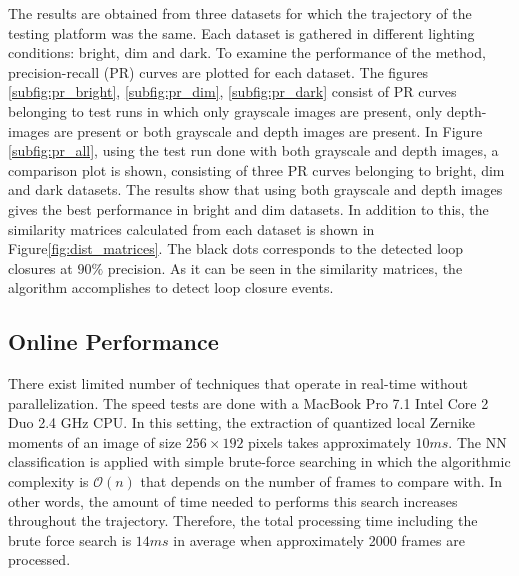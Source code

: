 \documentclass[]{spie}  %
\begin{document}
The results are obtained from three datasets for which the trajectory of the testing platform was the same. Each dataset is gathered in different lighting conditions: bright, dim and dark.
To examine the performance of the method, precision-recall (PR) curves are plotted for each dataset. The figures \ref{subfig:pr_bright}, \ref{subfig:pr_dim}, \ref{subfig:pr_dark} consist of PR curves belonging to test runs in which only grayscale images are present, only depth-images are present or both grayscale and depth images are present. In Figure \ref{subfig:pr_all}, using the test run done with both grayscale and depth images, a comparison plot is shown, consisting of three PR curves belonging to bright, dim and dark datasets. The results show that using both grayscale and depth images gives the best performance in bright and dim datasets. In addition to this, the similarity matrices calculated from each dataset is shown in Figure\ref{fig:dist_matrices}. The black dots corresponds to the detected loop closures at $90\%$ precision. As it can be seen in the similarity matrices, the algorithm accomplishes to detect loop closure events.


\subsection{Online Performance}

There exist limited number of techniques that operate in real-time without parallelization. The speed tests are done with a MacBook Pro 7.1 Intel Core 2 Duo 2.4 GHz CPU. In this setting, the extraction of quantized local Zernike moments of an image of size $256\times 192$ pixels takes approximately $10ms$. The NN classification is applied with simple brute-force searching in which the algorithmic complexity is $\mathcal{O}(n)$ that depends on the number of frames to compare with. In other words, the amount of time needed to performs this search increases throughout the trajectory. Therefore, the total processing time including the brute force search is $14ms$ in average when approximately 2000 frames are processed.
\end{document}
